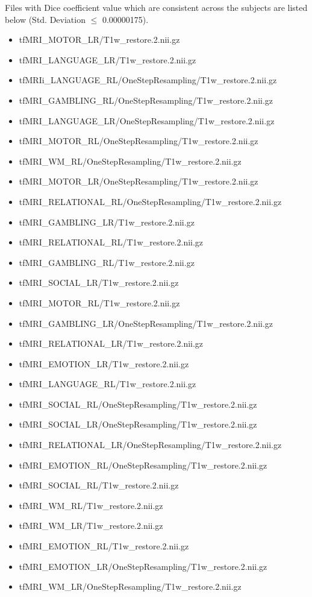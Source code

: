 Files with Dice coefficient value which are consistent across the subjects are listed below (Std. Deviation $\leq$ 0.00000175).
\begin{itemize}
  \item {tfMRI\_MOTOR\_LR/T1w\_restore.2.nii.gz}
  \item {tfMRI\_LANGUAGE\_LR/T1w\_restore.2.nii.gz}
  \item {tfMRIi\_LANGUAGE\_RL/OneStepResampling/T1w\_restore.2.nii.gz}
  \item {tfMRI\_GAMBLING\_RL/OneStepResampling/T1w\_restore.2.nii.gz}
  \item {tfMRI\_LANGUAGE\_LR/OneStepResampling/T1w\_restore.2.nii.gz}
  \item {tfMRI\_MOTOR\_RL/OneStepResampling/T1w\_restore.2.nii.gz}
  \item {tfMRI\_WM\_RL/OneStepResampling/T1w\_restore.2.nii.gz}
  \item {tfMRI\_MOTOR\_LR/OneStepResampling/T1w\_restore.2.nii.gz}
  \item {tfMRI\_RELATIONAL\_RL/OneStepResampling/T1w\_restore.2.nii.gz}
  \item {tfMRI\_GAMBLING\_LR/T1w\_restore.2.nii.gz}
  \item {tfMRI\_RELATIONAL\_RL/T1w\_restore.2.nii.gz}
  \item {tfMRI\_GAMBLING\_RL/T1w\_restore.2.nii.gz}
  \item {tfMRI\_SOCIAL\_LR/T1w\_restore.2.nii.gz}
  \item {tfMRI\_MOTOR\_RL/T1w\_restore.2.nii.gz}
  \item {tfMRI\_GAMBLING\_LR/OneStepResampling/T1w\_restore.2.nii.gz}
  \item {tfMRI\_RELATIONAL\_LR/T1w\_restore.2.nii.gz}
  \item {tfMRI\_EMOTION\_LR/T1w\_restore.2.nii.gz}
  \item {tfMRI\_LANGUAGE\_RL/T1w\_restore.2.nii.gz}
  \item {tfMRI\_SOCIAL\_RL/OneStepResampling/T1w\_restore.2.nii.gz}
  \item {tfMRI\_SOCIAL\_LR/OneStepResampling/T1w\_restore.2.nii.gz}
  \item {tfMRI\_RELATIONAL\_LR/OneStepResampling/T1w\_restore.2.nii.gz}
  \item {tfMRI\_EMOTION\_RL/OneStepResampling/T1w\_restore.2.nii.gz}
  \item {tfMRI\_SOCIAL\_RL/T1w\_restore.2.nii.gz}
  \item {tfMRI\_WM\_RL/T1w\_restore.2.nii.gz}
  \item {tfMRI\_WM\_LR/T1w\_restore.2.nii.gz}
  \item {tfMRI\_EMOTION\_RL/T1w\_restore.2.nii.gz}
  \item {tfMRI\_EMOTION\_LR/OneStepResampling/T1w\_restore.2.nii.gz}
  \item {tfMRI\_WM\_LR/OneStepResampling/T1w\_restore.2.nii.gz}
\end{itemize}

